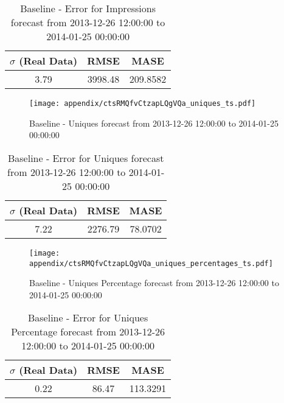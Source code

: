 \begin{table}[H]
\centering
\footnotesize
\begin{tabular}{ccc}
$\sigma$ (Real Data) & RMSE & MASE   \\ \hline
3.79 & 3998.48 & 209.8582 \\
\end{tabular}

\vspace{0.5cm}

\caption[]{
Baseline - Error for Impressions forecast from 2013-12-26 12:00:00 to 2014-01-25 00:00:00}
\end{table}

\begin{figure}[H] \begin{center} \leavevmode
\texttt{[image: appendix/ctsRMQfvCtzapLQgVQa\_uniques\_ts.pdf]} \caption[]{
Baseline - Uniques forecast from 2013-12-26 12:00:00 to 2014-01-25 00:00:00} \label{fig:appendix/ctsRMQfvCtzapLQgVQa_uniques_ts.pdf} \end{center}
\end{figure}

\begin{table}[H]
\centering
\footnotesize
\begin{tabular}{ccc}
$\sigma$ (Real Data) & RMSE & MASE   \\ \hline
7.22 & 2276.79 & 78.0702 \\
\end{tabular}

\vspace{0.5cm}

\caption[]{
Baseline - Error for Uniques forecast from 2013-12-26 12:00:00 to 2014-01-25 00:00:00}
\end{table}

\begin{figure}[H] \begin{center} \leavevmode
\texttt{[image: appendix/ctsRMQfvCtzapLQgVQa\_uniques\_percentages\_ts.pdf]} \caption[]{
Baseline - Uniques Percentage forecast from 2013-12-26 12:00:00 to 2014-01-25 00:00:00} \label{fig:appendix/ctsRMQfvCtzapLQgVQa_uniques_percentages_ts.pdf} \end{center}
\end{figure}

\begin{table}[H]
\centering
\footnotesize
\begin{tabular}{ccc}
$\sigma$ (Real Data) & RMSE & MASE   \\ \hline
0.22 & 86.47 & 113.3291 \\
\end{tabular}

\vspace{0.5cm}

\caption[]{
Baseline - Error for Uniques Percentage forecast from 2013-12-26 12:00:00 to 2014-01-25 00:00:00}
\end{table}


